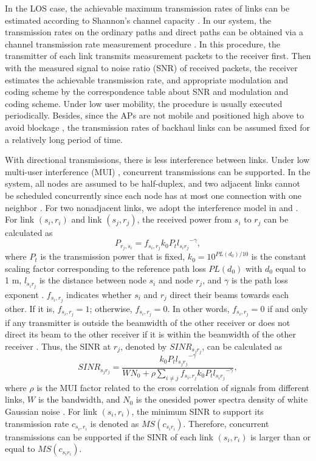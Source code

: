 \documentclass[journal]{IEEEtran}
\begin{document}
In the LOS case, the achievable maximum
transmission rates of links can be estimated according to Shannon's channel capacity \cite{Qiao}.
In our system, the transmission rates on the ordinary paths and direct paths can be obtained via a
channel transmission rate measurement procedure \cite{tvt_own}. In this procedure, the transmitter
of each link transmits measurement packets to the receiver first. Then with the measured signal to
noise ratio (SNR) of received packets, the receiver estimates the achievable transmission rate, and
appropriate modulation and coding scheme by the correspondence table about SNR and modulation and
coding scheme. Under low user mobility, the procedure is usually executed periodically. Besides,
since the APs are not mobile and positioned high above to avoid blockage \cite{Pico_60GHz}, the
transmission rates of backhaul links can be assumed fixed for a relatively long period of time.





With directional transmissions, there is less interference between links. Under low multi-user
interference (MUI) \cite{Qiao}, concurrent transmissions can be supported. In the system, all nodes
are assumed to be half-duplex, and two adjacent links cannot be scheduled concurrently since each
node has at most one connection with one neighbor \cite{mao}. For two nonadjacent links, we adopt
the interference model in \cite{Qiao} and \cite{Xu_mis}. For link $(s_i,r_i)$ and link $(s_j,r_j)$,
the received power from $s_i$ to $r_j$ can be calculated as
\begin{equation}
P_{r_j,s_i} = {f_{s_i,r_j}}k_0{P_t}{l_{s_ir_j}}^{ - \gamma },
\end{equation}
where ${{P_t}}$ is the transmission power that is fixed, $k_0 = {10^{PL({d_0})/10}}$ is the constant
scaling factor corresponding to the reference path loss ${PL({d_0})}$ with $d_0$ equal to 1 m,
${{l_{s_ir_j}}}$ is the distance between node $s_i$ and node $r_j$, and $\gamma $ is the path loss
exponent \cite{Qiao}. $f_{s_i,r_j}$ indicates whether $s_i$ and $r_j$ direct their beams towards
each other. If it is, ${{f_{s_i,r_j}}}=1$; otherwise, ${{f_{s_i,r_j}}}=0$. In other words, ${{f_{s_i,r_j}}}=0$ if and only if any transmitter is outside
the beamwidth of the other receiver or does not
direct its beam to the other receiver if it is within
the beamwidth of the other receiver \cite{Qiao_D2D}. Thus, the SINR at $r_j$,
denoted by $SINR_{s_jr_j}$, can be calculated as
\begin{equation}
SIN{R_{s_jr_j}} = \frac{{k_0{P_t}{l_{s_jr_j}}^{ - \gamma }}}{{W{N_0} + \rho \sum\limits_{i \ne j}
{{f_{s_i,r_j}}k_0{P_t}{l_{s_ir_j}}^{ - \gamma }} } },
\end{equation}
where $\rho$ is the MUI factor related to the cross correlation of signals from different links,
$W$ is the bandwidth, and ${{N_0}}$ is the onesided
power spectra density of white Gaussian noise \cite{Qiao}. For link $(s_i,r_i)$, the minimum SINR to support its transmission rate
${c_{s_i,r_i}}$ is denoted as $MS({c_{s_ir_i}})$. Therefore, concurrent transmissions can be
supported if the SINR of each link $(s_i,r_i)$ is larger than or equal to $MS({c_{s_ir_i}})$.
\end{document}

